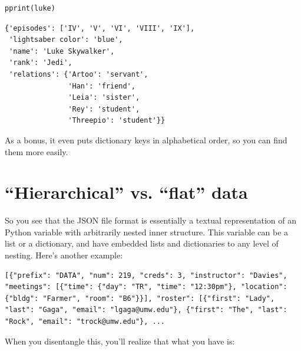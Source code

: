 \begin{Verbatim}[fontsize=\small,samepage=true,frame=single,framesep=3mm]
pprint(luke)
\end{Verbatim}
\vspace{-.2in}

\begin{Verbatim}[fontsize=\small,samepage=true,frame=leftline,framesep=5mm,framerule=1mm]
{'episodes': ['IV', 'V', 'VI', 'VIII', 'IX'],
 'lightsaber color': 'blue',
 'name': 'Luke Skywalker',
 'rank': 'Jedi',
 'relations': {'Artoo': 'servant',
               'Han': 'friend',
               'Leia': 'sister',
               'Rey': 'student',
               'Threepio': 'student'}}
\end{Verbatim}

As a bonus, it even puts dictionary keys in alphabetical order, so you can find
them more easily.


\section{``Hierarchical'' vs. ``flat'' data}


So you see that the JSON file format is essentially a textual representation of
an Python variable with arbitrarily nested inner structure. This variable can
be a list or a dictionary, and have embedded lists and dictionaries to any
level of nesting. Here's another example:

\vspace{-.2in}
\label{coursesJson}

\begin{Verbatim}[fontsize=\footnotesize,samepage=true,frame=lines,framesep=3mm]
[{"prefix": "DATA", "num": 219, "creds": 3, "instructor": "Davies",
"meetings": [{"time": {"day": "TR", "time": "12:30pm"}, "location":
{"bldg": "Farmer", "room": "B6"}}], "roster": [{"first": "Lady",
"last": "Gaga", "email": "lgaga@umw.edu"}, {"first": "The", "last":
"Rock", "email": "trock@umw.edu"}, ...
\end{Verbatim}

When you disentangle this, you'll realize that what you have is:

\vspace{.1in}

